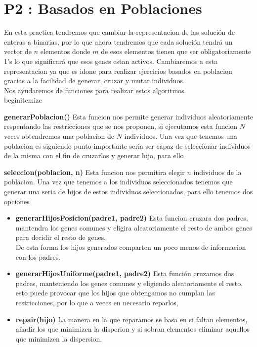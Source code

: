 \section{P2 : Basados en Poblaciones}
En esta practica tendremos que cambiar la representacion de las solución de enteras a binarias, por lo
que ahora tendremos que cada solución tendrá un vector de $n$ elementos donde $m$ de esos elementos tienen que ser
obligatoriamente 1's lo que significará que esos genes estan activos.
Cambiaremos a esta representacion ya que es idone para realizar ejercicios basados en poblacion gracias a la facilidad 
de generar, cruzar y mutar individuos.\\

Nos ayudaremos de funciones para realizar estos algoritmos
\\begin{itemize}
  \item \textbf{generarPoblacion()} Esta funcion nos permite generar individuos aleatoriamente respentando las 
  restricciones que se nos proponen, si ejecutamos esta funcion $N$ veces obtendremos una poblacion de $N$ individuos.
  Una vez que tenemos una poblacion es siguiendo punto importante seria ser capaz de seleccionar individuos de la misma
   con el fin de cruzarlos y generar hijo, para ello
  \item  \textbf{seleccion(poblacion, n)} Esta funcion nos permitira elegir $n$ individuos de la poblacion.
  Una vez que tenemos a los individuos seleccionados tenemos que generar una seria de hijos de estos individuos seleccionados, para ello tenemos dos opciones
  
  \begin{itemize}
    \item  \textbf{generarHijosPosicion(padre1, padre2)} Esta funcion cruzara dos padres, mantendra los genes comunes y 
    eligira aleatoriamente el resto de ambos genes para decidir el resto de genes.\\
    De esta forma los hijos generados comparten un poco menos de informacion con los padres.
    \item  \textbf{generarHijosUniforme(padre1, padre2)} Esta función cruzamos dos padres, manteniendo los genes comunes y 
    eligiendo aleatoriamente el resto, esto puede provocar que los hijos que obtengamos no cumplan las restricciones, por lo que 
    a veces en necesario reparlos,
    \item  \textbf{repair(hijo)} La manera en la que reparamos se basa en si faltan elementos,
     añadir los que minimizen la disperion y si sobran elementos eliminar aquellos que minimizen la dispersion.  
  \end{itemize}

